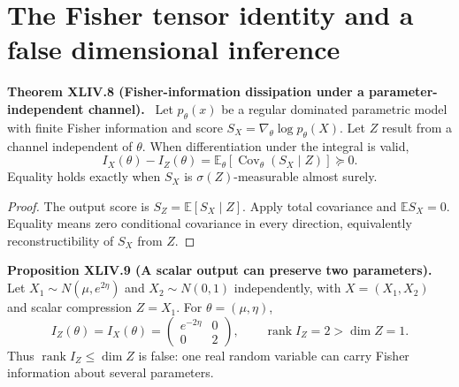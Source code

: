 \documentclass[11pt,a4paper,oneside]{book}
\DeclareMathOperator{\rank}{rank}\DeclareMathOperator{\Tr}{Tr}
\newcommand{\statement}[3]{\par\medskip\noindent\textbf{#1 #2 (#3).}\ }
\begin{document}
\section{The Fisher tensor identity and a false dimensional inference}
\statement{Theorem}{XLIV.8}{Fisher-information dissipation under a parameter-independent channel}
Let $p_\theta(x)$ be a regular dominated parametric model with finite Fisher information and score $S_X=\nabla_\theta\log p_\theta(X)$. Let $Z$ result from a channel independent of $\theta$. When differentiation under the integral is valid,
\begin{equation}I_X(\theta)-I_Z(\theta)=\mathbb E_\theta[\operatorname{Cov}_\theta(S_X\mid Z)]\succeq0.\tag{190}\end{equation}
Equality holds exactly when $S_X$ is $\sigma(Z)$-measurable almost surely.
\begin{proof}
The output score is $S_Z=\mathbb E[S_X\mid Z]$. Apply total covariance and $\mathbb ES_X=0$. Equality means zero conditional covariance in every direction, equivalently reconstructibility of $S_X$ from $Z$.
\end{proof}
\statement{Proposition}{XLIV.9}{A scalar output can preserve two parameters}
Let $X_1\sim N(\mu,e^{2\eta})$ and $X_2\sim N(0,1)$ independently, with $X=(X_1,X_2)$ and scalar compression $Z=X_1$. For $\theta=(\mu,\eta)$,
\[I_Z(\theta)=I_X(\theta)=\begin{pmatrix}e^{-2\eta}&0\\0&2\end{pmatrix},\qquad\rank I_Z=2>\dim Z=1.\]
Thus $\rank I_Z\le\dim Z$ is false: one real random variable can carry Fisher information about several parameters.
\end{document}
